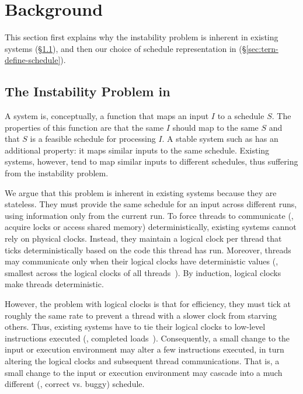 \section{Background}
\label{sec:tern-background}

This section first explains why the instability
problem is inherent in existing \dmt systems (\S\ref{sec:dmt-background}),
and then our choice of schedule representation in \tern
(\S\ref{sec:tern-define-schedule}).

\subsection{The Instability Problem in \dmt} \label{sec:dmt-background}

A \dmt system is, conceptually, a function that maps an input $I$ to a
schedule $S$.  The properties of this function are that the same $I$
should map to the same $S$ and that $S$ is a feasible schedule for
processing $I$.  A stable \dmt system such as \tern has an additional
property: it maps similar inputs to the same schedule.  Existing \dmt
systems, however, tend to map similar inputs to different schedules, thus
suffering from the instability problem.  

We argue that this problem is inherent in existing \dmt systems because
they are stateless.  They must provide the same schedule for an input
across different runs, using information only from the current run.
To force threads to communicate (\eg, acquire locks or access shared memory)
deterministically, existing \dmt systems cannot rely on physical clocks. 
Instead, they
maintain a logical clock per thread that ticks deterministically based on
the code this thread has run.  Moreover, threads may communicate only when
their logical clocks have deterministic values (\eg, smallest across the
logical clocks of all threads~\cite{kendo:asplos09}).  By induction,
logical clocks make threads deterministic.

However, the problem with logical clocks is that for efficiency,
they must tick at
roughly the same rate to prevent a thread with a slower clock from
starving others.  Thus, existing \dmt systems have to tie their logical
clocks to low-level instructions executed (\eg, completed
loads~\cite{kendo:asplos09}).  Consequently, a small change to the input or
execution environment may alter a few instructions executed, in turn
altering the logical clocks and subsequent thread communications.  That is,
a small change to the input or execution environment may cascade into a
much different (\eg, correct vs. buggy) schedule.  


